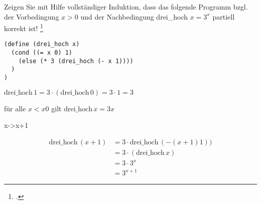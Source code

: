 \documentclass{bschlangaul-aufgabe}
\begin{document}

\let\m=\bInduktionMarkierung
\let\e=\bInduktionErklaerung

Zeigen Sie mit Hilfe vollständiger Induktion, dass das folgende
Programm bzgl. der Vorbedingung $x > 0$ und der Nachbedingung drei\_hoch
$x =  3^x$ partiell korrekt ist!
\footcite[Thema 2 Aufgabe 5]{examen:66112:2003:09}

\begin{verbatim}
(define (drei_hoch x)
  (cond ((= x 0) 1)
    (else (* 3 (drei_hoch (- x 1))))
  )
)
\end{verbatim}

\def\drei{\text{drei\_hoch}\,}

\begin{bAntwort}

%

\bInduktionAnfang

$\drei 1 = 3 \cdot (\drei 0) = 3 \cdot 1 = 3$

%

\bInduktionVoraussetzung

für alle $x < x 0$ gilt $\drei x = 3 x$

%

\bInduktionSchritt

x->x+1

\begin{align*}
\drei (x + 1)
& = 3 \cdot \drei (- (x + 1) 1))\\
& = 3 \cdot (\drei x)\\
& = 3 \cdot 3^x\\
& = 3^{x+1}
\end{align*}
\end{bAntwort}
\end{document}
